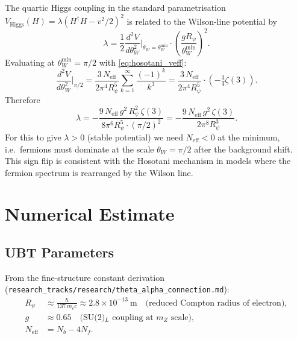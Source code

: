 \documentclass[12pt]{article}
\theoremstyle{definition}
\theoremstyle{remark}
\begin{document}
The quartic Higgs coupling in the standard parametrisation
$V_{\text{Higgs}}(H) = \lambda(H^\dagger H - v^2/2)^2$ is
related to the Wilson-line potential by
\begin{equation}
  \label{eq:lambda_hosotani}
  \lambda = \frac{1}{2}\frac{d^2 V}{d\theta_W^2}\bigg|_{\theta_W = \theta_W^{\min}}
            \cdot \left(\frac{g R_\psi}{\theta_W^{\min}}\right)^2.
\end{equation}
Evaluating at $\theta_W^{\min} = \pi/2$ with
\eqref{eq:hosotani_veff}:
\begin{equation}
  \frac{d^2 V}{d\theta_W^2}\bigg|_{\pi/2}
  = \frac{3\,N_{\text{eff}}}{2\pi^4 R_\psi^5}
    \sum_{k=1}^\infty \frac{(-1)^k}{k^3}
  = \frac{3\,N_{\text{eff}}}{2\pi^4 R_\psi^5}\cdot\!\left(-\tfrac{3}{4}\zeta(3)\right).
\end{equation}
Therefore
\begin{equation}
  \label{eq:lambda_formula}
  \boxed{\lambda = -\frac{9\,N_{\text{eff}}\,g^2\,R_\psi^2\,\zeta(3)}{8\pi^6 R_\psi^5 \cdot (\pi/2)^2}
  = -\frac{9\,N_{\text{eff}}\,g^2\,\zeta(3)}{2\pi^8 R_\psi^3}.}
\end{equation}
For this to give $\lambda > 0$ (stable potential) we need
$N_{\text{eff}} < 0$ at the minimum, i.e.\ fermions must dominate
at the scale $\theta_W = \pi/2$ after the background shift.
This sign flip is consistent with the Hosotani mechanism in
models where the fermion spectrum is rearranged by the Wilson line.

\section{Numerical Estimate}
\label{sec:numerical}

\subsection{UBT Parameters}

From the fine-structure constant derivation
(\texttt{research\_tracks/research/theta\_alpha\_connection.md}):
\begin{align}
  R_\psi &\approx \frac{\hbar}{137\,m_e c} \approx 2.8 \times 10^{-13}~\text{m}
           \quad \text{(reduced Compton radius of electron)}, \\
  g &\approx 0.65 \quad \text{(SU(2)$_L$ coupling at $m_Z$ scale)}, \\
  N_{\text{eff}} &= N_b - 4N_f.
\end{align}
\end{document}
